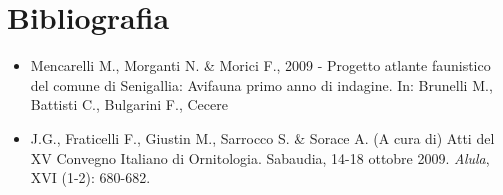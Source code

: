 \section*{Bibliografia}
\begin{itemize}\itemsep0pt
	\item Mencarelli M., Morganti N. \& Morici F., 2009 - Progetto atlante
faunistico del comune di Senigallia: Avifauna primo anno di indagine. In: Brunelli M., Battisti
C., Bulgarini F., Cecere

	\item J.G., Fraticelli F., Giustin M., Sarrocco S. \& Sorace A. (A cura di)
Atti del XV Convegno Italiano di Ornitologia. Sabaudia, 14-18 ottobre 2009. \textit{Alula},
XVI (1-2): 680-682.
\end{itemize}
